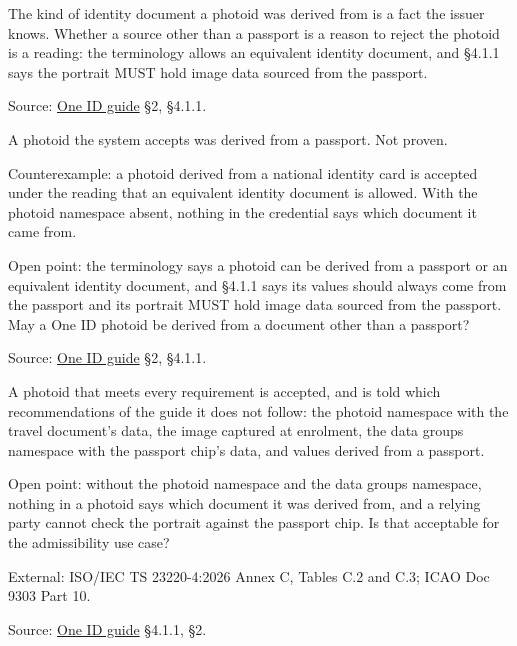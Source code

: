 \begin{definition}
  \label{def:photoid-source}
  The kind of identity document a photoid was derived from is a fact the
  issuer knows.  Whether a source other than a passport is a reason to reject
  the photoid is a reading: the terminology allows an equivalent identity
  document, and §4.1.1 says the portrait MUST hold image data sourced from
  the passport.

  Source: \href{https://standards.atlassian.net/wiki/spaces/OneID/pages/2947416082/Technical+Implementation+Guide}{One ID guide} §2, §4.1.1.
\end{definition}

\begin{theorem}
  \label{thm:photoid-from-passport}
  A photoid the system accepts was derived from a passport.  Not proven.

  Counterexample: a photoid derived from a national identity card is accepted
  under the reading that an equivalent identity document is allowed.  With
  the photoid namespace absent, nothing in the credential says which document
  it came from.

  Open point: the terminology says a photoid can be derived from a passport
  or an equivalent identity document, and §4.1.1 says its values should
  always come from the passport and its portrait MUST hold image data sourced
  from the passport.  May a One ID photoid be derived from a document other
  than a passport?

  Source: \href{https://standards.atlassian.net/wiki/spaces/OneID/pages/2947416082/Technical+Implementation+Guide}{One ID guide} §2, §4.1.1.
\end{theorem}

\begin{definition}
  \label{def:photoid-advisories}
  A photoid that meets every requirement is accepted, and is told which
  recommendations of the guide it does not follow: the photoid namespace with
  the travel document's data, the image captured at enrolment, the data
  groups namespace with the passport chip's data, and values derived from a
  passport.

  Open point: without the photoid namespace and the data groups namespace,
  nothing in a photoid says which document it was derived from, and a relying
  party cannot check the portrait against the passport chip.  Is that
  acceptable for the admissibility use case?

  External: ISO/IEC TS 23220-4:2026 Annex C, Tables C.2 and C.3; ICAO Doc 9303
  Part 10.

  Source: \href{https://standards.atlassian.net/wiki/spaces/OneID/pages/2947416082/Technical+Implementation+Guide}{One ID guide} §4.1.1, §2.
\end{definition}

